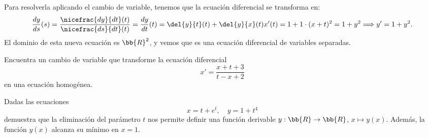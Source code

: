 \documentclass[12pt]{article}
\begin{document}
\begin{ejercicio}
    Para resolverla aplicando el cambio de variable, tenemos que la ecuación diferencial se transforma en:
    \begin{equation*}
        \dfrac{dy}{ds}(s) = \dfrac{\nicefrac{dy}{dt}(t)}{\nicefrac{ds}{dt}(t)} = \dfrac{dy}{dt}(t) = \del{y}{t}(t) + \del{y}{x}(t)x'(t) = 1 + 1\cdot (x+t)^2 = 1 + y^2
        \Longrightarrow y'=1+y^2.
    \end{equation*}
    El dominio de esta nueva ecuación es $\bb{R}^2$, y vemos que es una ecuación diferencial de variables separadas.

    \begin{comment}
    \begin{itemize}
        \item Soluciones Constantes:
        
        No tiene
        \item Soluciones No Constantes:
        \begin{equation*}
            \int \dfrac{dy}{1+y^2} = \int ds \Longrightarrow \arctan y = s + C
        \end{equation*}

        Usando la condición inicial $x(0)=0$, tenemos que $y(0)=x(0)+0=0$. Evaluando la solución en 0, tenemos que:
        \begin{equation*}
            \arctan y(0) = 0 + C \Longrightarrow C = 0
        \end{equation*}

        Despejando $y$, tenemos que $y(s) = \tan(s)$ para todo $s\in \left]-\dfrac{\pi}{2}, \dfrac{\pi}{2}\right[$ (hemos elegido este intervalo para que la tangente sea continua).
        Deshaciendo el cambio de variable, tenemos que $x(t) = \tan(t)-t$ para todo $t\in \left]-\dfrac{\pi}{2}, \dfrac{\pi}{2}\right[$.
    \end{itemize}
    \end{comment}
\end{ejercicio}

\begin{ejercicio}
    Encuentra un cambio de variable que transforme la ecuación diferencial
    \[
        x' = \dfrac{x + t + 3}{t - x + 2}
    \]
    en una ecuación homogénea.
\end{ejercicio}

\begin{ejercicio}
    Dadas las ecuaciones
    \[
        x = t + e^t, \quad y = 1 + t^4
    \]
    demuestra que la eliminación del parámetro \(t\) nos permite definir una función derivable \(y : \bb{R} \to \bb{R}\), \(x \mapsto y(x)\). Además, la función \(y(x)\) alcanza su mínimo en \(x = 1\).
\end{ejercicio}
\end{document}
